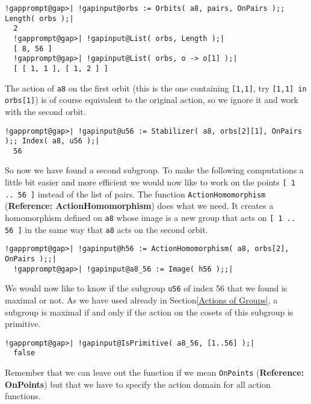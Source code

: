 \documentclass[a4paper,11pt]{report}
\begin{document}
{{ 
\begin{Verbatim}[commandchars=!@|,fontsize=\small,frame=single,label=Example]
  !gapprompt@gap>| !gapinput@orbs := Orbits( a8, pairs, OnPairs );; Length( orbs );|
  2
  !gapprompt@gap>| !gapinput@List( orbs, Length );|
  [ 8, 56 ]
  !gapprompt@gap>| !gapinput@List( orbs, o -> o[1] );|
  [ [ 1, 1 ], [ 1, 2 ] ]
\end{Verbatim}
 

 The action of \texttt{a8} on the first orbit (this is the one containing \texttt{[1,1]}, try \texttt{[1,1] in orbs[1]}) is of course equivalent to the original action, so we ignore it and work
with the second orbit. 

 
\begin{Verbatim}[commandchars=!@|,fontsize=\small,frame=single,label=Example]
  !gapprompt@gap>| !gapinput@u56 := Stabilizer( a8, orbs[2][1], OnPairs );; Index( a8, u56 );|
  56
\end{Verbatim}
 

 So now we have found a second subgroup. To make the following computations a
little bit easier and more efficient we would now like to work on the points \texttt{[ 1 .. 56 ]} instead of the list of pairs. The function \texttt{ActionHomomorphism} (\textbf{Reference: ActionHomomorphism}) does what we need. It creates a homomorphism defined on \texttt{a8} whose image is a new group that acts on \texttt{[ 1 .. 56 ]} in the same way that \texttt{a8} acts on the second orbit. 

 
\begin{Verbatim}[commandchars=!@|,fontsize=\small,frame=single,label=Example]
  !gapprompt@gap>| !gapinput@h56 := ActionHomomorphism( a8, orbs[2], OnPairs );;|
  !gapprompt@gap>| !gapinput@a8_56 := Image( h56 );;|
\end{Verbatim}
 

 We would now like to know if the subgroup \texttt{u56} of index 56 that we found is maximal or not. As we have used already in
Section{\nobreakspace}\ref{Actions of Groups}, a subgroup is maximal if and only if the action on the cosets of this
subgroup is primitive. 

 
\begin{Verbatim}[commandchars=!@|,fontsize=\small,frame=single,label=Example]
  !gapprompt@gap>| !gapinput@IsPrimitive( a8_56, [1..56] );|
  false
\end{Verbatim}
 

 Remember that we can leave out the function if we mean \texttt{OnPoints} (\textbf{Reference: OnPoints}) but that we have to specify the action domain for all action functions. 

}}
\end{document}

